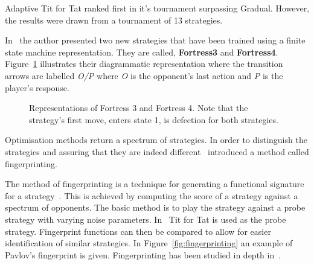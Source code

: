 \documentclass{article}
\theoremstyle{definition}
\begin{document}
Adaptive Tit for Tat ranked first in it's tournament surpassing Gradual. However,
the results were drawn from a tournament of 13 strategies.


In~\cite{Ashlock2006b} the author presented two new strategies that have
been trained using a finite state machine representation. They are called,
\textbf{Fortress3} and \textbf{Fortress4}. Figure~\ref{fig:fortress3_and_4}
illustrates their diagrammatic representation where the transition arrows are
labelled \textit{O/P} where \textit{O} is the opponent's last action and \textit{P}
is the player's response.

\begin{figure}[!hbtp]
\centering
    \begin{subfigure}{.4\textwidth}
        
    \end{subfigure}
    \begin{subfigure}{.4\textwidth}\centering
        
     \end{subfigure}
     \caption{Representations of Fortress 3 and Fortress 4. Note that the
     strategy's first move, enters state 1, is defection for both strategies.}
     \label{fig:fortress3_and_4}
\end{figure}

Optimisation methods return a spectrum of strategies. In order to distinguish
the strategies and assuring that they are indeed different~\cite{Ashlock2005}
introduced a method called fingerprinting.

The method of fingerprinting is a technique for generating a functional signature for a
strategy~\cite{Ashlock2008}. This is achieved by computing the score of a strategy
against a spectrum of opponents. The basic method is to play the strategy
against a probe strategy with varying noise parameters. In~\cite{Ashlock2005}
Tit for Tat is used as the probe strategy. Fingerprint functions
can then be compared to allow for easier identification of similar strategies.
In Figure~\ref{fig:fingerprinting} an example of Pavlov's fingerprint is given.
Fingerprinting has been studied in depth in~\cite{Ashlock2008, Ashlock2009,
Ashlock2010, Ashlock2006a}.
\end{document}
